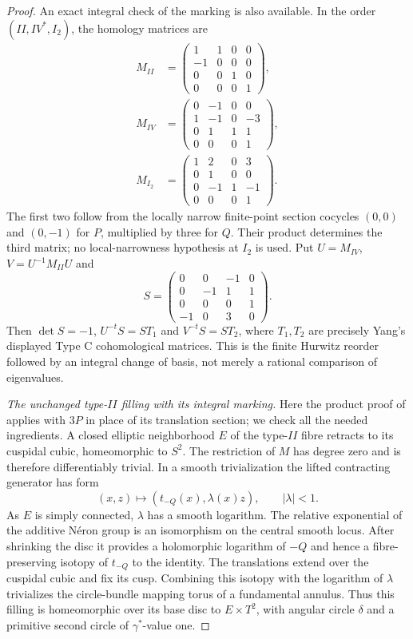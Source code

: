 \begin{proof}
An exact integral check of the marking is also available.
In the order $(II,IV^*,I_2)$, the homology matrices are
\[
 \begin{split}
 M_{II}&=\begin{pmatrix}1&1&0&0\\-1&0&0&0\\0&0&1&0\\0&0&0&1\end{pmatrix},\\
 M_{IV}&=\begin{pmatrix}0&-1&0&0\\1&-1&0&-3\\0&1&1&1\\0&0&0&1\end{pmatrix},\\
 M_{I_2}&=\begin{pmatrix}1&2&0&3\\0&1&0&0\\0&-1&1&-1\\0&0&0&1\end{pmatrix}.
 \end{split}
\]
The first two follow from the locally narrow finite-point
section cocycles $(0,0)$ and $(0,-1)$ for $P$, multiplied by
three for $Q$. Their product determines the third matrix;
no local-narrowness hypothesis at $I_2$ is used.
Put $U=M_{IV}$, $V=U^{-1}M_{II}U$ and
\[
 S=\begin{pmatrix}
 0&0&-1&0\\0&-1&1&1\\0&0&0&1\\-1&0&3&0
 \end{pmatrix}.
\]
Then $\det S=-1$, $U^{-t}S=ST_1$ and $V^{-t}S=ST_2$,
where $T_1,T_2$ are precisely Yang's displayed Type C
cohomological matrices. This is the finite Hurwitz reorder
followed by an integral change of basis, not merely a rational
comparison of eigenvalues.

\emph{The unchanged type-$II$ filling with its integral marking.}
Here the product proof of \cite[Lemma 3.10]{manLR26} applies
with $3P$ in place of its translation section; we check all the
needed ingredients. A closed elliptic neighborhood $E$ of the
type-$II$ fibre retracts to its cuspidal cubic, homeomorphic to
$S^2$. The restriction of $M$ has degree zero and is therefore
differentiably trivial. In a smooth trivialization the lifted
contracting generator has form
\[
 (x,z)\longmapsto(t_{-Q}(x),\lambda(x)z),\qquad |\lambda|<1.
\]
As $E$ is simply connected, $\lambda$ has a smooth logarithm.
The relative exponential of the additive N\'eron group is an
isomorphism on the central smooth locus. After shrinking the
disc it provides a holomorphic logarithm of $-Q$ and hence a
fibre-preserving isotopy of $t_{-Q}$ to the identity.
The translations extend over the cuspidal cubic and fix its
cusp. Combining this isotopy with the logarithm of $\lambda$
trivializes the circle-bundle mapping torus of a fundamental
annulus. Thus this filling is homeomorphic over its base disc
to $E\times T^2$, with angular circle $\delta$ and a primitive
second circle of $\gamma^*$-value one.


\end{proof}
